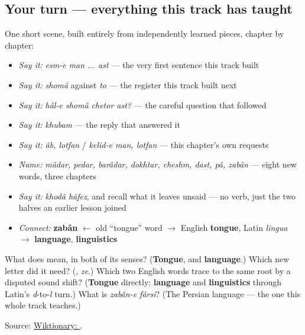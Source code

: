 \subsection*{Your turn — everything this track has taught}
One short scene, built entirely from independently learned pieces, chapter by chapter:

\begin{itemize}
\raggedright
  \item \emph{Say it:} \emph{esm-e man ... ast} — the very first sentence this track built
  \item \emph{Say it:} \emph{shomâ} against \emph{to} — the register this track built next
  \item \emph{Say it:} \emph{hâl-e shomâ chetor ast?} — the careful question that followed
  \item \emph{Say it:} \emph{khubam} — the reply that answered it
  \item \emph{Say it:} \emph{âb, lotfan} / \emph{kelid-e man, lotfan} — this chapter's own requests
  \item \emph{Name:} \emph{mâdar, pedar, barâdar, dokhtar, cheshm, dast, pâ, zabân} — eight new words, three chapters
  \item \emph{Say it:} \emph{khodâ hâfez}, and recall what it leaves unsaid — no verb, just the two halves an earlier lesson joined
  \item \emph{Connect:} \textbf{zabân} $\leftarrow$ old “tongue” word $\to$ English \textbf{tongue}, Latin \emph{lingua} $\to$ \textbf{language}, \textbf{linguistics}
\end{itemize}

\begin{tcolorbox}[breakable,colback=teal!4,colframe=teal!35!black,title={Before you move on}]
What does \textbf{} mean, in both of its senses? (\textbf{Tongue}, and \textbf{language}.) Which new letter did it need? (\textbf{}, \emph{ze}.) Which two English words trace to the same root by a disputed sound shift? (\textbf{Tongue} directly; \textbf{language} and \textbf{linguistics} through Latin's \emph{d}-to-\emph{l} turn.) What is \emph{zabân-e fârsi}? (The Persian language — the one this whole track teaches.)

Source: \href{https://en.wiktionary.org/wiki/\%D8\%B2\%D8\%A8\%D8\%A7\%D9\%86}{Wiktionary: }.
\end{tcolorbox}
